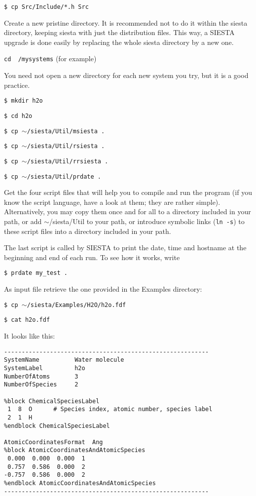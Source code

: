 {\tt \$ cp Src/Include/*.h Src}

Create a new pristine directory. It is recommended not to
do it within the siesta directory, keeping siesta with just
the distribution files. This way, a SIESTA upgrade is done
easily by replacing the whole siesta directory by a new one.

{\tt cd ~/mysystems} (for example)

\noindent
You need not open a new directory
for each new system you try, but it is a good practice.

{\tt \$ mkdir h2o}

{\tt \$ cd h2o}

{\tt \$ cp $\sim$/siesta/Util/msiesta .}

{\tt \$ cp $\sim$/siesta/Util/rsiesta .}

{\tt \$ cp $\sim$/siesta/Util/rrsiesta .}

{\tt \$ cp $\sim$/siesta/Util/prdate .}

\noindent
Get the four script files that will help you to compile and
run the program (if you know the script language, have a
look at them; they are rather simple). Alternatively, you
may copy them once and for all to a directory included in 
your path, or add $\sim$/siesta/Util to your path, or introduce
symbolic links ({\tt ln -s}) to these script files into a
directory included in your path.

The last script is called by SIESTA to print the date, time
and hostname at the beginning and end of each run.
To see how it works, write

{\tt \$ prdate my\_test .}

\noindent
As input file retrieve the one provided in the Examples directory:

{\tt \$ cp $\sim$/siesta/Examples/H2O/h2o.fdf}

{\tt \$ cat h2o.fdf}

\noindent
It looks like this:
\begin{verbatim}
----------------------------------------------------------
SystemName          Water molecule
SystemLabel         h2o
NumberOfAtoms       3
NumberOfSpecies     2

%block ChemicalSpeciesLabel
 1  8  O      # Species index, atomic number, species label
 2  1  H
%endblock ChemicalSpeciesLabel

AtomicCoordinatesFormat  Ang
%block AtomicCoordinatesAndAtomicSpecies
 0.000  0.000  0.000  1
 0.757  0.586  0.000  2
-0.757  0.586  0.000  2
%endblock AtomicCoordinatesAndAtomicSpecies
----------------------------------------------------------
\end{verbatim}

